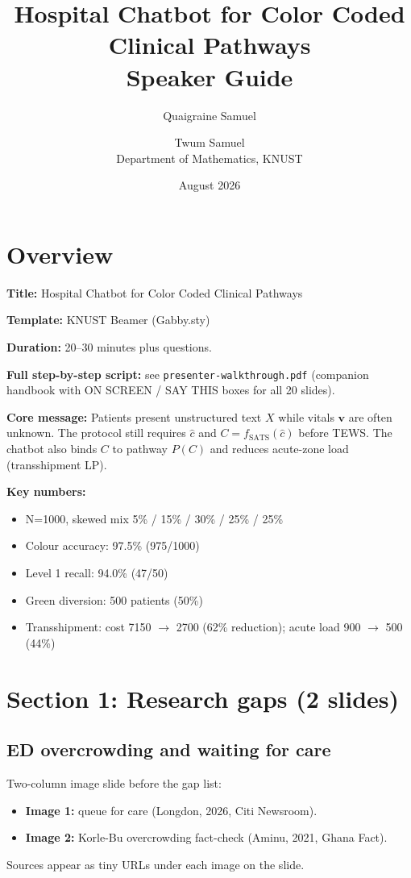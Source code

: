 \documentclass[11pt,a4paper]{article}
\title{Hospital Chatbot for Color Coded Clinical Pathways\\Speaker Guide}
\author{Quaigraine Samuel \and Twum Samuel\\Department of Mathematics, KNUST}
\date{August 2026}
\begin{document}
\maketitle
\tableofcontents
\newpage

\section{Overview}

\textbf{Title:} Hospital Chatbot for Color Coded Clinical Pathways

\textbf{Template:} KNUST Beamer (Gabby.sty)

\textbf{Duration:} 20--30 minutes plus questions.

\textbf{Full step-by-step script:} see \texttt{presenter-walkthrough.pdf} (companion handbook with ON SCREEN / SAY THIS boxes for all 20 slides).

\textbf{Core message:} Patients present unstructured text $X$ while vitals $\mathbf{v}$ are often unknown. The protocol still requires $\hat{c}$ and $C = f_{\mathrm{SATS}}(\hat{c})$ before TEWS. The chatbot also binds $C$ to pathway $P(C)$ and reduces acute-zone load (transshipment LP).

\textbf{Key numbers:}
\begin{itemize}[noitemsep]
  \item N=1000, skewed mix 5\% / 15\% / 30\% / 25\% / 25\%
  \item Colour accuracy: 97.5\% (975/1000)
  \item Level 1 recall: 94.0\% (47/50)
  \item Green diversion: 500 patients (50\%)
  \item Transshipment: cost 7150 $\to$ 2700 (62\% reduction); acute load 900 $\to$ 500 (44\%)
\end{itemize}

\section{Section 1: Research gaps (2 slides)}

\subsection{ED overcrowding and waiting for care}

Two-column image slide before the gap list:
\begin{itemize}[noitemsep]
  \item \textbf{Image 1:} queue for care (Longdon, 2026, Citi Newsroom).
  \item \textbf{Image 2:} Korle-Bu overcrowding fact-check (Aminu, 2021, Ghana Fact).
\end{itemize}
Sources appear as tiny URLs under each image on the slide.
\end{document}

